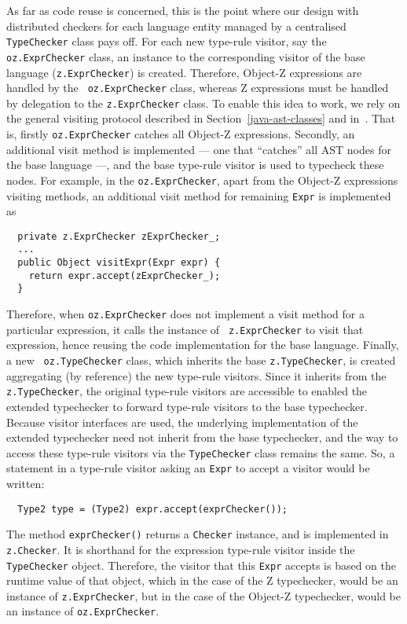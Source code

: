 \documentclass{llncs}
\begin{document}
As far as code reuse is concerned, this is the point where our design
with distributed checkers for each language entity managed by a
centralised {\tt TypeChecker} class pays off.  For each new type-rule
visitor, say the {\tt oz.ExprChecker} class, an instance to the
corresponding visitor of the base language ({\tt z.ExprChecker}) is
created. Therefore, Object-Z expressions are handled by the {\tt
oz.ExprChecker} class, whereas Z expressions must be handled by delegation
to the {\tt z.ExprChecker} class.  To enable this idea to work, we rely on
the general visiting protocol described in Section~\ref{java-ast-classes} 
and in~\cite{czt}.
That is, firstly {\tt oz.ExprChecker} catches all Object-Z expressions.
Secondly, an additional visit method is implemented --- one that
``catches'' all AST nodes for the base language ---, and the base
type-rule visitor is used to typecheck these nodes.  For example, in
the {\tt oz.ExprChecker}, apart from the Object-Z expressions
visiting methods, an additional visit method for remaining {\tt Expr}
is implemented as
%
\begin{verbatim}
  private z.ExprChecker zExprChecker_;
  ...
  public Object visitExpr(Expr expr) {
    return expr.accept(zExprChecker_);
  }
\end{verbatim}
%
Therefore, when {\tt oz.ExprChecker} does not implement a visit method
for a particular expression, it calls the instance of {\tt
z.ExprChecker} to visit that expression, hence reusing the code
implementation for the base language.  Finally, a new {\tt
oz.TypeChecker} class, which inherits the base {\tt z.TypeChecker}, is
created aggregating (by reference) the new type-rule visitors.  Since
it inherits from the {\tt z.TypeChecker}, the original type-rule
visitors are accessible to enabled the extended typechecker to forward
type-rule visitors to the base typechecker.  Because visitor
interfaces are used, the underlying implementation of the extended
typechecker need not inherit from the base typechecker, and the way to
access these type-rule visitors via the {\tt TypeChecker} class
remains the same.  So, a statement in a type-rule visitor asking
an {\tt Expr} to accept a visitor would be written:
%
\begin{verbatim}
  Type2 type = (Type2) expr.accept(exprChecker());
\end{verbatim}
%
The method {\tt exprChecker()} returns a {\tt Checker} instance, and
is implemented in {\tt z.Checker}. It is shorthand for the expression
type-rule visitor inside the {\tt TypeChecker} object. Therefore, the
visitor that this {\tt Expr} accepts is based on the runtime value of
that object, which in the case of the Z typechecker, would be an
instance of {\tt z.ExprChecker}, but in the case of the Object-Z
typechecker, would be an instance of {\tt oz.ExprChecker}.
\end{document}
